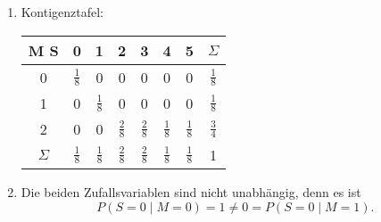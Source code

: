 \documentclass[a4paper]{article}
\begin{document}
\subsection{}
\begin{enumerate}
    \item Kontigenztafel:
    \begin{center}
        \begin{tabular}{|c|c|c|c|c|c|c|c|}
            \hline
            M  S & 0 & 1 & 2 & 3 & 4 & 5 & $\Sigma$ \\ \hline
            0 & $\frac{1}{8}$ & 0 & 0 & 0 & 0 & 0 & $\frac{1}{8}$ \\ \hline
            1 & 0 & $\frac{1}{8}$ & 0 & 0 & 0 & 0 & $\frac{1}{8}$ \\ \hline
            2 & 0 & 0 & $\frac{2}{8}$ & $\frac{2}{8}$ & $\frac{1}{8}$ & $\frac{1}{8}$ & $\frac{3}{4}$\\ \hline
            $\Sigma$ & $\frac{1}{8}$ & $\frac{1}{8}$ & $\frac{2}{8}$ & $\frac{2}{8}$ & $\frac{1}{8}$ & $\frac{1}{8}$ &  1 \\ \hline
        \end{tabular}
    \end{center}
    \item Die beiden Zufallsvariablen sind nicht unabhängig, denn es ist 
    \begin{equation*}
        P(S = 0 \mid M = 0) = 1 \neq 0 = P(S = 0 \mid M = 1) \text{.}
    \end{equation*}
\end{enumerate}
\end{document}
